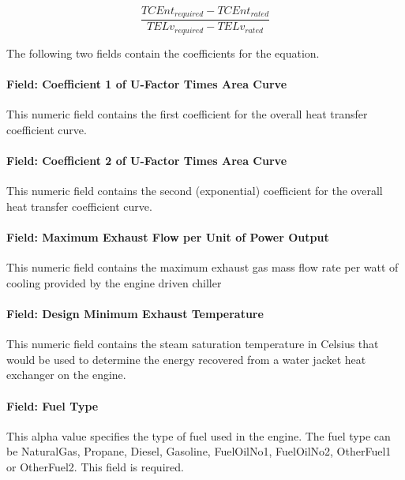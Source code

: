 \begin{equation}
    \frac{{TCEn{t_{required}} - TCEn{t_{rated}}}}{{TEL{v_{required}} - TEL{v_{rated}}}}
\end{equation}

The following two fields contain the coefficients for the equation.

\paragraph{Field: Coefficient 1 of U-Factor Times Area Curve}\label{field-coefficient-1-of-u-factor-times-area-curve-000}

This numeric field contains the first coefficient for the overall heat transfer coefficient curve.

\paragraph{Field: Coefficient 2 of U-Factor Times Area Curve}\label{field-coefficient-2-of-u-factor-times-area-curve-000}

This numeric field contains the second (exponential) coefficient for the overall heat transfer coefficient curve.

\paragraph{Field: Maximum Exhaust Flow per Unit of Power Output}\label{field-maximum-exhaust-flow-per-unit-of-power-output-000}

This numeric field contains the maximum exhaust gas mass flow rate per watt of cooling provided by the engine driven chiller

\paragraph{Field: Design Minimum Exhaust Temperature}\label{field-design-minimum-exhaust-temperature-000}

This numeric field contains the steam saturation temperature in Celsius that would be used to determine the energy recovered from a water jacket heat exchanger on the engine.

\paragraph{Field: Fuel Type}\label{field-fuel-type-002}

This alpha value specifies the type of fuel used in the engine. The fuel type can be NaturalGas, Propane, Diesel, Gasoline, FuelOilNo1, FuelOilNo2, OtherFuel1 or OtherFuel2. This field is required.

